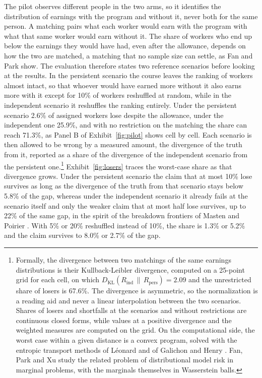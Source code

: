 \documentclass[11pt,a4paper]{article}
\begin{document}
The pilot observes different people in the two arms, so it identifies the distribution of earnings with the program and without it, never both for the same person. A matching pairs what each worker would earn with the program with what that same worker would earn without it. The share of workers who end up below the earnings they would have had, even after the allowance, depends on how the two are matched, a matching that no sample size can settle, as Fan and Park \cite{fanpark} show. The evaluation therefore states two reference scenarios before looking at the results. In the persistent scenario the course leaves the ranking of workers almost intact, so that whoever would have earned more without it also earns more with it except for 10\% of workers reshuffled at random, while in the independent scenario it reshuffles the ranking entirely. Under the persistent scenario 2.6\% of assigned workers lose despite the allowance, under the independent one 25.9\%, and with no restriction on the matching the share can reach 71.3\%, as Panel B of Exhibit~\ref{fig:pilot} shows cell by cell. Each scenario is then allowed to be wrong by a measured amount, the divergence of the truth from it, reported as a share of the divergence of the independent scenario from the persistent one.\footnote{Formally, the divergence between two matchings of the same earnings distributions is their Kullback-Leibler divergence, computed on a 25-point grid for each cell, on which $D_{\mathrm{KL}}(R_{\mathrm{ind}}\,\|\,R_{\mathrm{pers}})=2.09$ and the unrestricted share of losers is 67.6\%. The divergence is asymmetric, so the normalization is a reading aid and never a linear interpolation between the two scenarios. Shares of losers and shortfalls at the scenarios and without restrictions are continuous closed forms, while values at a positive divergence and the weighted measures are computed on the grid. On the computational side, the worst case within a given distance is a convex program, solved with the entropic transport methods of Léonard \cite{leonard} and of Galichon and Henry \cite{galichon}. Fan, Park and Xu \cite{fanparkxu} study the related problem of distributional model risk in marginal problems, with the marginals themselves in Wasserstein balls.} Exhibit~\ref{fig:losers} traces the worst-case share as that divergence grows. Under the persistent scenario the claim that at most 10\% lose survives as long as the divergence of the truth from that scenario stays below 5.8\% of the gap, whereas under the independent scenario it already fails at the scenario itself and only the weaker claim that at most half lose survives, up to 22\% of the same gap, in the spirit of the breakdown frontiers of Masten and Poirier \cite{masten}. With 5\% or 20\% reshuffled instead of 10\%, the share is 1.3\% or 5.2\% and the claim survives to 8.0\% or 2.7\% of the gap.
\end{document}
